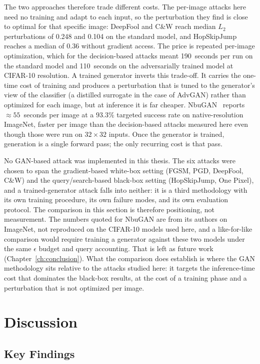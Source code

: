 The two approaches therefore trade different costs. The per-image attacks here need no training and adapt to each input, so the perturbation they find is close to optimal for that specific image: DeepFool and C\&W reach median $L_2$ perturbations of 0.248 and 0.104 on the standard model, and HopSkipJump reaches a median of 0.36 without gradient access. The price is repeated per-image optimization, which for the decision-based attacks meant 190~seconds per run on the standard model and 110~seconds on the adversarially trained model at CIFAR-10 resolution. A trained generator inverts this trade-off. It carries the one-time cost of training and produces a perturbation that is tuned to the generator's view of the classifier (a distilled surrogate in the case of AdvGAN) rather than optimized for each image, but at inference it is far cheaper. NbuGAN~\cite{topal2026nbugan} reports $\approx 55$~seconds per image at a $93.3\%$ targeted success rate on native-resolution ImageNet, faster per image than the decision-based attacks measured here even though those were run on $32 \times 32$ inputs. Once the generator is trained, generation is a single forward pass; the only recurring cost is that pass.

No GAN-based attack was implemented in this thesis. The six attacks were chosen to span the gradient-based white-box setting (FGSM, PGD, DeepFool, C\&W) and the query/search-based black-box setting (HopSkipJump, One Pixel), and a trained-generator attack falls into neither: it is a third methodology with its own training procedure, its own failure modes, and its own evaluation protocol. The comparison in this section is therefore positioning, not measurement. The numbers quoted for NbuGAN are from its authors on ImageNet, not reproduced on the CIFAR-10 models used here, and a like-for-like comparison would require training a generator against these two models under the same $\epsilon$ budget and query accounting. That is left as future work (Chapter~\ref{ch:conclusion}). What the comparison does establish is where the GAN methodology sits relative to the attacks studied here: it targets the inference-time cost that dominates the black-box results, at the cost of a training phase and a perturbation that is not optimized per image.

\section{Discussion}

\subsection{Key Findings}

